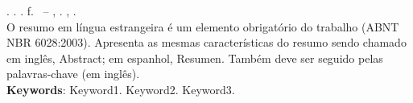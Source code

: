 \begin{resumo}[ABSTRACT]
\begin{SingleSpacing}

\imprimircitacaoautor. \MakeUppercase{\textbf{\imprimirtitulo}}. \textnormal{\imprimirdata. \pageref {LastPage} f. \imprimirprojeto\ – \imprimircurso, \imprimirinstituicao. \imprimirlocal, \imprimirdata}.\\


O resumo em língua estrangeira é um elemento obrigatório do trabalho (ABNT NBR
6028:2003). Apresenta as mesmas características do resumo sendo chamado em inglês,
Abstract; em espanhol, Resumen. Também deve ser seguido pelas palavras-chave (em inglês).\\

\textbf{Keywords}: Keyword1. Keyword2. Keyword3.

\end{SingleSpacing}
\end{resumo}